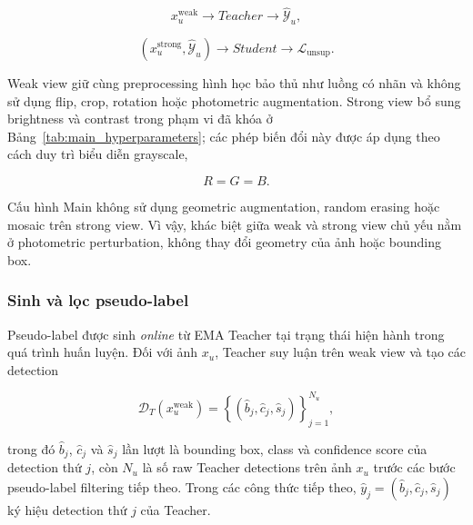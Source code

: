 \documentclass[pdflatex,sn-mathphys-num]{sn-jnl}%
\theoremstyle{thmstyleone}%
\theoremstyle{thmstyletwo}%
\theoremstyle{thmstylethree}%
\begin{document}
\begin{equation}
x_u^{\mathrm{weak}}
\longrightarrow
Teacher
\longrightarrow
\widehat{\mathcal{Y}}_u,
\label{eq:unlabeled_weak_teacher}
\end{equation}

\begin{equation}
\left(
x_u^{\mathrm{strong}},
\widehat{\mathcal{Y}}_u
\right)
\longrightarrow
Student
\longrightarrow
\mathcal{L}_{\mathrm{unsup}}.
\label{eq:unlabeled_strong_student}
\end{equation}

Weak view giữ cùng preprocessing hình học bảo thủ như luồng có nhãn và không
sử dụng flip, crop, rotation hoặc photometric augmentation. Strong view bổ
sung brightness và contrast trong phạm vi đã khóa ở
Bảng~\ref{tab:main_hyperparameters}; các phép biến đổi này được áp dụng theo
cách duy trì biểu diễn grayscale,

\begin{equation}
R=G=B.
\label{eq:ssl_strong_grayscale_constraint}
\end{equation}

Cấu hình Main không sử dụng geometric augmentation, random erasing hoặc
mosaic trên strong view. Vì vậy, khác biệt giữa weak và strong view chủ yếu
nằm ở photometric perturbation, không thay đổi geometry của ảnh hoặc bounding
box.

\subsubsection{Sinh và lọc pseudo-label}
\label{subsec:Pseudo_label_Generation_and_Filtering}
\label{subsubsec:pseudo_label_source}
\label{subsubsec:pseudo_label_confidence_thresholds}

Pseudo-label được sinh \textit{online} từ EMA Teacher tại trạng thái hiện
hành trong quá trình huấn luyện. Đối với ảnh \(x_u\), Teacher suy luận trên
weak view và tạo các detection

\begin{equation}
\mathcal{D}_{T}(x_u^{\mathrm{weak}})
=
\left\{
\left(
\hat{b}_j,
\hat{c}_j,
\hat{s}_j
\right)
\right\}_{j=1}^{N_u},
\label{eq:teacher_raw_detections}
\end{equation}

trong đó \(\hat{b}_j\), \(\hat{c}_j\) và \(\hat{s}_j\) lần lượt là bounding
box, class và confidence score của detection thứ \(j\), còn \(N_u\) là số raw
Teacher detections trên ảnh \(x_u\) trước các bước pseudo-label filtering tiếp
theo. Trong các công thức tiếp theo,
\(\hat{y}_j=(\hat{b}_j,\hat{c}_j,\hat{s}_j)\) ký hiệu detection thứ \(j\)
của Teacher.
\end{document}
